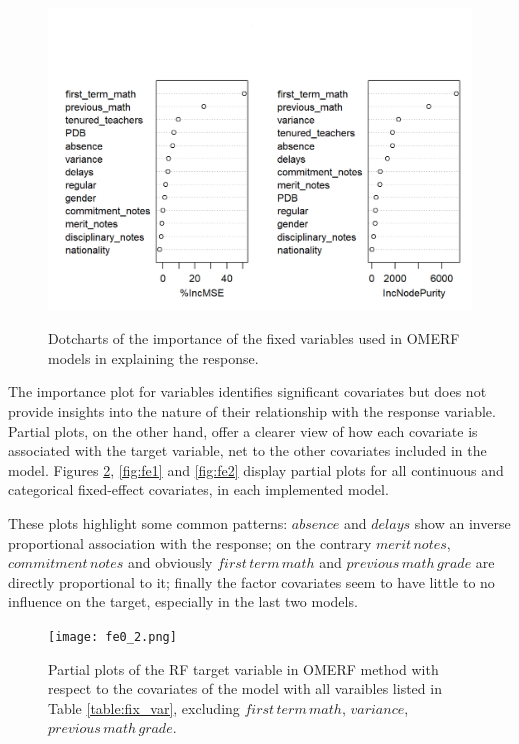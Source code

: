 \begin{figure}[H]
{        \includegraphics[scale=0.4]{Images/varimp2_2.png}
    }
    \caption[]{Dotcharts of the importance of the fixed variables used in OMERF models in explaining the response.}
    \label{fig:varimp}
\end{figure}

The importance plot for variables identifies significant covariates but does not provide insights into the nature of their relationship with the response variable.
Partial plots, on the other hand, offer a clearer view of how each covariate is associated with the target variable, net to the other covariates included in the model.
Figures \ref{fig:fe0}, \ref{fig:fe1} and \ref{fig:fe2} display partial plots for all continuous and categorical fixed-effect covariates, in each implemented model.

These plots highlight some common patterns: \(absence\) and \(delays\) show an inverse proportional association with the response; on the contrary \(merit \, notes\), \(commitment \, notes\) and obviously \(first \, term \, math\) and \(previous \, math \, grade\) are directly proportional to it;
finally the factor covariates seem to have little to no influence on the target, especially in the last two models.

\begin{figure}[H]
    \centering
    \texttt{[image: fe0\_2.png]}
    \caption{Partial plots of the RF target variable in OMERF method with respect to the covariates of the model with all varaibles listed in Table \ref{table:fix_var}, excluding \(first \, term \, math\), \(variance\), \(previous \, math \, grade\).}
    \label{fig:fe0}
\end{figure}

